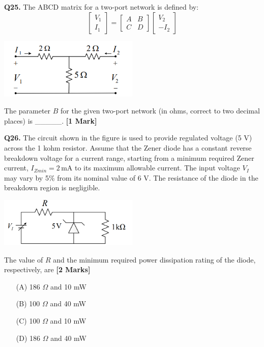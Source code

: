 \documentclass[11pt]{article}
\newcommand{\questiona}[2]{
    \noindent\textbf{Q#2.} #1 \hfill \textbf{[1 Mark]}
}
\newcommand{\questionb}[2]{
    \noindent\textbf{Q#2.} #1 \hfill \textbf{[2 Marks]}
}
\begin{document}
\questiona{The ABCD matrix for a two-port network is defined by:
\[
\begin{bmatrix}
V_1 \\
I_1
\end{bmatrix}
=
\begin{bmatrix}
A & B \\
C & D
\end{bmatrix}
\begin{bmatrix}
V_2 \\
-I_2
\end{bmatrix}
\]

\begin{center}
\includegraphics[width=0.5\textwidth]{figures/25.png}
\end{center}

The parameter $B$ for the given two-port network (in ohms, correct to two decimal places) is \_\_\_\_\_.}{25}

\vspace{0.5cm}

\questionb{The circuit shown in the figure is used to provide regulated voltage (5 V) across the 1 kohm resistor. Assume that the Zener diode has a constant reverse breakdown voltage for a current range, starting from a minimum required Zener current, $I_{Zmin} = 2\,\text{mA}$ to its maximum allowable current. The input voltage $V_I$ may vary by 5\% from its nominal value of 6 V. The resistance of the diode in the breakdown region is negligible.

\begin{center}
\includegraphics[width=0.5\textwidth]{figures/26.png}
\end{center}

The value of $R$ and the minimum required power dissipation rating of the diode, respectively, are}{26}
\begin{enumerate}
    \item[(A)] 186 $\Omega$ and 10 mW
    \item[(B)] 100 $\Omega$ and 40 mW
    \item[(C)] 100 $\Omega$ and 10 mW
    \item[(D)] 186 $\Omega$ and 40 mW
\end{enumerate}
\end{document}

